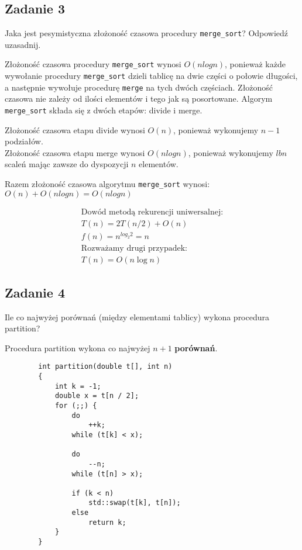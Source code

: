 \documentclass{article}
\begin{document}
    \subsection*{Zadanie 3}
    Jaka jest pesymistyczna złożoność czasowa procedury \verb+merge_sort+? Odpowiedź uzasadnij.
    \begin{center}
        Złożoność czasowa procedury \verb+merge_sort+ wynosi $O(nlogn)$, ponieważ każde wywołanie procedury 
        \verb+merge_sort+ dzieli tablicę na dwie części o połowie długości, a następnie wywołuje procedurę \verb+merge+ 
        na tych dwóch częściach. Złożoność czasowa nie zależy od ilości elementów i tego jak są posortowane. 
        Algorym \verb+merge_sort+ składa się z dwóch etapów: divide i merge. \\
        \begin{center}
            Złożoność czasowa etapu divide wynosi $O(n)$, ponieważ wykonujemy $n - 1$ podziałów. \\
            Złożoność czasowa etapu merge wynosi $O(nlogn)$, ponieważ wykonujemy $lb n$ scaleń mając zawsze
            do dyspozycji $n$ elementów. \\                
        \end{center}
        Razem złożoność czasowa algorytmu \verb+merge_sort+ wynosi: $O(n) + O(nlogn) = O(nlogn)$
    \end{center}
    \begin{gather*}
        \text{Dowód metodą rekurencji uniwersalnej:} \\
        T(n) = 2T(n/2) + O(n) \\
        f(n) = n^{log_2 2} = n \\
        \text{Rozważamy drugi przypadek:} \\
        T(n) = O(n \log n)
    \end{gather*}

    \subsection*{Zadanie 4}
    Ile co najwyżej porównań (między elementami tablicy) wykona procedura partition?
    \begin{center}
        Procedura partition wykona co najwyżej $n + 1$ \textbf{porównań}. \\
    \end{center}

    \begin{lstlisting}
        int partition(double t[], int n) 
        {
            int k = -1;
            double x = t[n / 2];
            for (;;) {
                do
                    ++k;
                while (t[k] < x);

                do
                    --n;
                while (t[n] > x);

                if (k < n)
                    std::swap(t[k], t[n]);
                else
                    return k;
            }
        }
    \end{lstlisting}
    
\end{document}
